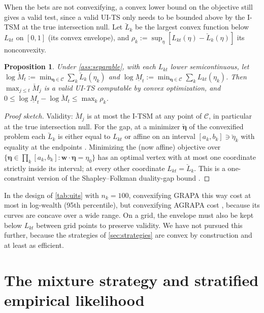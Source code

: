 \documentclass[11pt]{article}
\newcommand{\bs}{\boldsymbol}
\newcommand{\calC}{\mathcal{C}}
\newcommand{\conv}[1]{\breve{#1}}          %
\theoremstyle{plain}
\newtheorem{proposition}[theorem]{Proposition}
\theoremstyle{definition}
\theoremstyle{remark}
\begin{document}
When the bets are not convexifying, a convex lower bound on the objective still gives a valid test, since a valid
UI-TS only needs to be bounded above by the I-TSM at the true intersection null.  Let $\conv L_k$ be the largest convex
function below $L_{kt}$ on $[0,1]$ (its convex envelope), and $\rho_k := \sup_{\eta}[L_{kt}(\eta)-\conv L_k(\eta)]$ its
nonconvexity.

\begin{proposition}\label{prop:convexify}
Under \cref{ass:separable}, with each $L_{kt}$ lower semicontinuous, let
$\log\conv M_t := \min_{\bs\eta\in\calC}\sum_k\conv L_k(\eta_k)$ and $\log\underline M_t := \min_{\bs\eta\in\calC}\sum_kL_{kt}(\eta_k)$.
Then $\max_{j\le t}\conv M_j$ is a valid UI-TS computable by convex optimization, and
$0\le\log\underline M_t-\log\conv M_t\le\max_k\rho_k$.
\end{proposition}

\begin{proof}[Proof sketch]
Validity: $\conv M_j$ is at most the I-TSM at any point of $\calC$, in particular at the true intersection null.  For the
gap, at a minimizer $\breve{\bs\eta}$ of the convexified problem each $\conv L_k$ is either equal to $L_{kt}$ or affine on
an interval $[a_k,b_k]\ni\breve\eta_k$ with equality at the endpoints \citep[Section 17]{rockafellar1970convex}.  Minimizing
the (now affine) objective over $\{\bs\eta\in\prod_k[a_k,b_k]:\bs w\cdot\bs\eta=\eta_0\}$ has an optimal vertex with at most
one coordinate strictly inside its interval; at every other coordinate $L_{kt}=\conv L_k$.  This is a one-constraint
version of the Shapley--Folkman duality-gap bound \citep{starr1969quasi, aubin1976estimates}.
\end{proof}

In the design of \cref{tab:uits} with $n_k=100$, convexifying GRAPA this way cost at most \grapaconvloss{} in log-wealth
(95th percentile), but convexifying AGRAPA cost \agrapaconvloss{}, because its curves are concave over a wide range.  On a
grid, the envelope must also be kept below $L_{kt}$ between grid points to preserve validity.  We have not pursued this
further, because the strategies of \cref{sec:strategies} are convex by construction and at least as efficient.

\section{The mixture strategy and stratified empirical likelihood}\label{app:regret}
\end{document}
